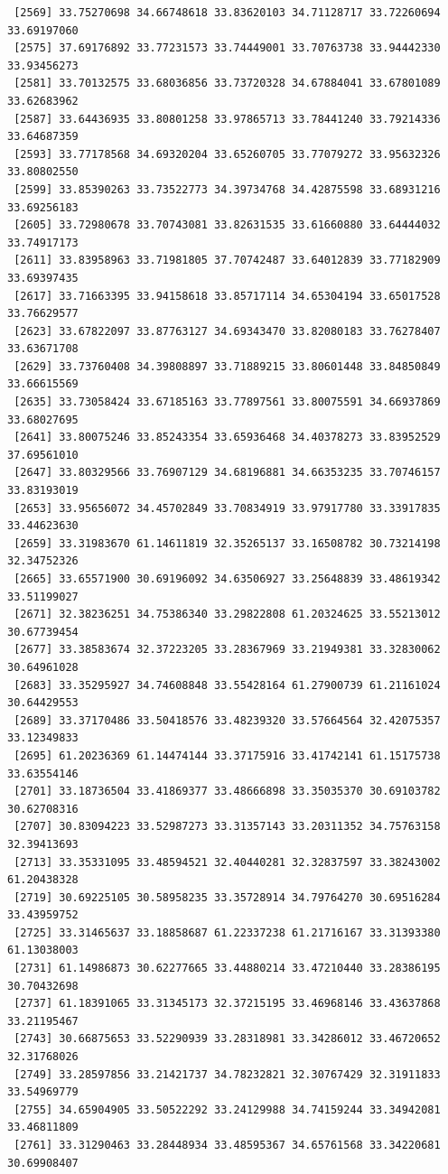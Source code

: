 \documentclass[
  letterpaper,
  DIV=11,
  numbers=noendperiod]{scrartcl}
\begin{document}
\begin{verbatim}
 [2569] 33.75270698 34.66748618 33.83620103 34.71128717 33.72260694 33.69197060
 [2575] 37.69176892 33.77231573 33.74449001 33.70763738 33.94442330 33.93456273
 [2581] 33.70132575 33.68036856 33.73720328 34.67884041 33.67801089 33.62683962
 [2587] 33.64436935 33.80801258 33.97865713 33.78441240 33.79214336 33.64687359
 [2593] 33.77178568 34.69320204 33.65260705 33.77079272 33.95632326 33.80802550
 [2599] 33.85390263 33.73522773 34.39734768 34.42875598 33.68931216 33.69256183
 [2605] 33.72980678 33.70743081 33.82631535 33.61660880 33.64444032 33.74917173
 [2611] 33.83958963 33.71981805 37.70742487 33.64012839 33.77182909 33.69397435
 [2617] 33.71663395 33.94158618 33.85717114 34.65304194 33.65017528 33.76629577
 [2623] 33.67822097 33.87763127 34.69343470 33.82080183 33.76278407 33.63671708
 [2629] 33.73760408 34.39808897 33.71889215 33.80601448 33.84850849 33.66615569
 [2635] 33.73058424 33.67185163 33.77897561 33.80075591 34.66937869 33.68027695
 [2641] 33.80075246 33.85243354 33.65936468 34.40378273 33.83952529 37.69561010
 [2647] 33.80329566 33.76907129 34.68196881 34.66353235 33.70746157 33.83193019
 [2653] 33.95656072 34.45702849 33.70834919 33.97917780 33.33917835 33.44623630
 [2659] 33.31983670 61.14611819 32.35265137 33.16508782 30.73214198 32.34752326
 [2665] 33.65571900 30.69196092 34.63506927 33.25648839 33.48619342 33.51199027
 [2671] 32.38236251 34.75386340 33.29822808 61.20324625 33.55213012 30.67739454
 [2677] 33.38583674 32.37223205 33.28367969 33.21949381 33.32830062 30.64961028
 [2683] 33.35295927 34.74608848 33.55428164 61.27900739 61.21161024 30.64429553
 [2689] 33.37170486 33.50418576 33.48239320 33.57664564 32.42075357 33.12349833
 [2695] 61.20236369 61.14474144 33.37175916 33.41742141 61.15175738 33.63554146
 [2701] 33.18736504 33.41869377 33.48666898 33.35035370 30.69103782 30.62708316
 [2707] 30.83094223 33.52987273 33.31357143 33.20311352 34.75763158 32.39413693
 [2713] 33.35331095 33.48594521 32.40440281 32.32837597 33.38243002 61.20438328
 [2719] 30.69225105 30.58958235 33.35728914 34.79764270 30.69516284 33.43959752
 [2725] 33.31465637 33.18858687 61.22337238 61.21716167 33.31393380 61.13038003
 [2731] 61.14986873 30.62277665 33.44880214 33.47210440 33.28386195 30.70432698
 [2737] 61.18391065 33.31345173 32.37215195 33.46968146 33.43637868 33.21195467
 [2743] 30.66875653 33.52290939 33.28318981 33.34286012 33.46720652 32.31768026
 [2749] 33.28597856 33.21421737 34.78232821 32.30767429 32.31911833 33.54969779
 [2755] 34.65904905 33.50522292 33.24129988 34.74159244 33.34942081 33.46811809
 [2761] 33.31290463 33.28448934 33.48595367 34.65761568 33.34220681 30.69908407

\end{verbatim}
\end{document}
